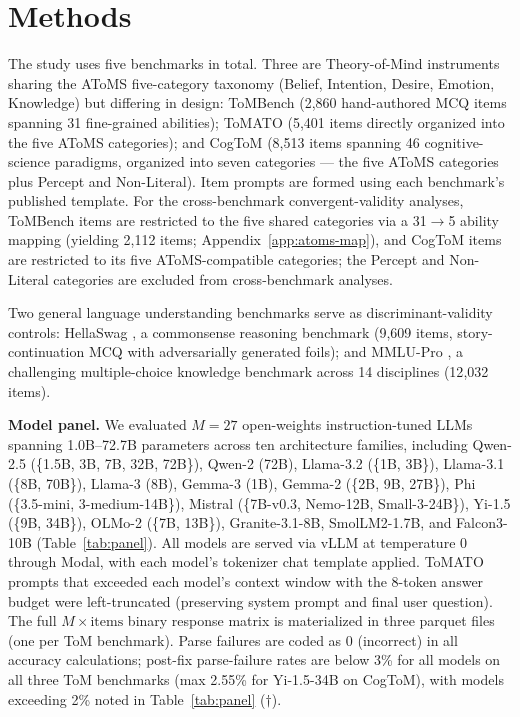 \documentclass{article} %
\begin{document}
\section{Methods}
\label{sec:methods}
 
The study uses five benchmarks in total. Three are Theory-of-Mind instruments sharing the AToMS five-category taxonomy (Belief, Intention, Desire, Emotion, Knowledge) but differing in design: ToMBench \citep{chen2024tombench} (2{,}860 hand-authored MCQ items spanning 31 fine-grained abilities); ToMATO \citep{shinoda2025tomato} (5{,}401 items directly organized into the five AToMS categories); and CogToM \citep{tong2026cogtom} (8{,}513 items spanning 46 cognitive-science paradigms, organized into seven categories --- the five AToMS categories plus Percept and Non-Literal). Item prompts are formed using each benchmark's published template. For the cross-benchmark convergent-validity analyses, ToMBench items are restricted to the five shared categories via a 31$\to$5 ability mapping (yielding 2{,}112 items; Appendix~\ref{app:atoms-map}), and CogToM items are restricted to its five AToMS-compatible categories; the Percept and Non-Literal categories are excluded from cross-benchmark analyses.
 
Two general language understanding benchmarks serve as discriminant-validity controls: HellaSwag \citep{zellers2019hellaswag}, a commonsense reasoning benchmark (9{,}609 items, story-continuation MCQ with adversarially generated foils); and MMLU-Pro \citep{wang2024mmlu}, a challenging multiple-choice knowledge benchmark across 14 disciplines (12{,}032 items).
 
\textbf{Model panel.} We evaluated $M=27$ open-weights instruction-tuned LLMs spanning 1.0B--72.7B parameters across ten architecture families, including Qwen-2.5 (\{1.5B, 3B, 7B, 32B, 72B\}), Qwen-2 (72B), Llama-3.2 (\{1B, 3B\}), Llama-3.1 (\{8B, 70B\}), Llama-3 (8B), Gemma-3 (1B), Gemma-2 (\{2B, 9B, 27B\}), Phi (\{3.5-mini, 3-medium-14B\}), Mistral (\{7B-v0.3, Nemo-12B, Small-3-24B\}), Yi-1.5 (\{9B, 34B\}), OLMo-2 (\{7B, 13B\}), Granite-3.1-8B, SmolLM2-1.7B, and Falcon3-10B (Table~\ref{tab:panel}). All models are served via vLLM \citep{vllm2023} at temperature 0 through Modal, with each model's tokenizer chat template applied. ToMATO prompts that exceeded each model's context window with the 8-token answer budget were left-truncated (preserving system prompt and final user question). The full $M \times \text{items}$ binary response matrix is materialized in three parquet files (one per ToM benchmark). Parse failures are coded as 0 (incorrect) in all accuracy calculations; post-fix parse-failure rates are below 3\% for all models on all three ToM benchmarks (max 2.55\% for Yi-1.5-34B on CogToM), with models exceeding 2\% noted in Table~\ref{tab:panel} ($\dagger$).
 
\end{document}
